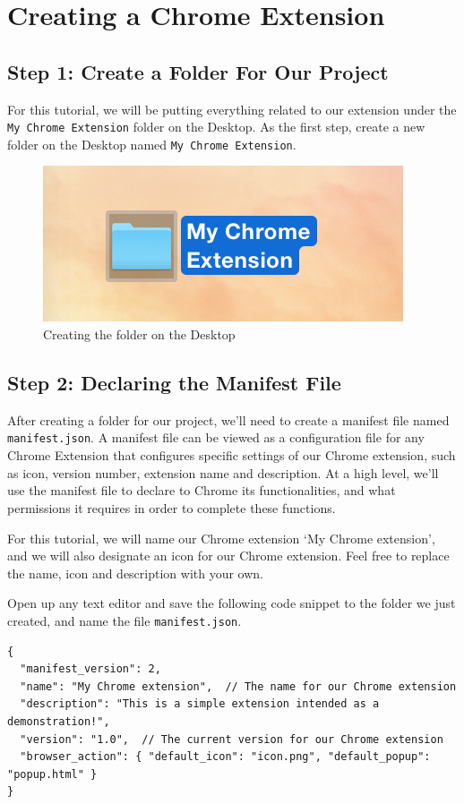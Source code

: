 \documentclass[11pt]{article}
\begin{document}
\section{Creating a Chrome Extension}
\subsection{Step 1: Create a Folder For Our Project}

For this tutorial, we will be putting everything related to our extension under the \texttt{My Chrome Extension} folder on the Desktop. As the first step, create a new folder on the Desktop named \texttt{My Chrome Extension}.

	\begin{figure}[htb]
	\centering
	\includegraphics[width=.3\textwidth]{figures/folder.png}
	\caption{Creating the folder on the Desktop\label{fig:folder}}
	\end{figure}

\subsection{Step 2: Declaring the Manifest File}

After creating a folder for our project, we'll need to create a manifest file named \texttt{manifest.json}. A manifest file can be viewed as a configuration file for any Chrome Extension that configures specific settings of our Chrome extension, such as icon, version number, extension name and description. At a high level, we'll use the manifest file to declare to Chrome its functionalities, and what permissions it requires in order to complete these functions.

For this tutorial, we will name our Chrome extension `My Chrome extension', and we will also designate an icon for our Chrome extension. Feel free to replace the name, icon and description with your own.

Open up any text editor and save the following code snippet to the folder we just created, and name the file \texttt{manifest.json}.

\begin{lstlisting}[mathescape]
{
  "manifest_version": 2,
  "name": "My Chrome extension",  // The name for our Chrome extension
  "description": "This is a simple extension intended as a demonstration!",
  "version": "1.0",  // The current version for our Chrome extension
  "browser_action": { "default_icon": "icon.png", "default_popup": "popup.html" }
}
\end{lstlisting}
\end{document}
